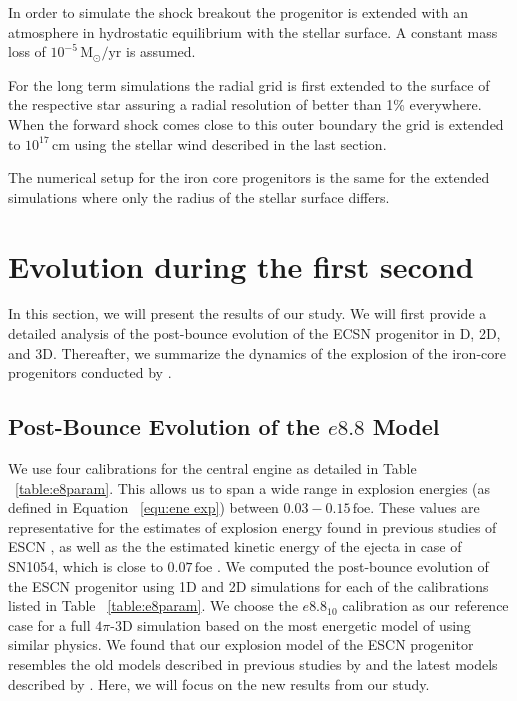 \documentclass[fleqn,usenatbib]{mnras}
\begin{document}
In order to simulate the shock breakout the progenitor is extended with an atmosphere in hydrostatic equilibrium with the stellar surface. A constant mass loss of $10^{-5}\,\mathrm{M_{\odot}/yr}$ is assumed. 


For the long term simulations the radial grid is first extended to the surface of the respective star assuring a radial resolution of better than 1\% everywhere. When the forward shock comes close to this outer boundary the grid is extended to $10^{17}\,\mathrm{cm}$ using the stellar wind described in the last section. 

The numerical setup for the iron core progenitors is the same for the extended simulations where only the radius of the stellar surface differs. 

\section{Evolution during the first second}
In this section, we will present the results of our study. We will first provide a detailed analysis of the post-bounce evolution of the ECSN progenitor in D, 2D, and 3D. Thereafter, we summarize the dynamics of the explosion of the iron-core progenitors conducted by \citealt{Melson2015a,Melson2019}. 

\subsection{Post-Bounce Evolution of the $e8.8$ Model}
We use four calibrations for the central engine as detailed in Table ~\ref{table:e8param}. This allows us to span a wide range in explosion energies (as defined in Equation ~\ref{equ:ene exp}) between $0.03-0.15\, \text{foe}$. These values are representative for the estimates of explosion energy found in previous studies of ESCN \citep{Groote2014,Radice2017}, as well as the the estimated kinetic energy of the ejecta in case of SN1054, which is close to $0.07\, \text{foe}$ \citep{Smith2013}. We computed the post-bounce evolution of the ESCN progenitor using 1D and 2D simulations for each of the calibrations listed in Table ~\ref{table:e8param}. We choose the $e8.8_{10}$ calibration as our reference case for a full $4\pi$-3D simulation based on the most energetic model of \citet{Groote2014} using similar physics. 
We found that our explosion model of the ESCN progenitor resembles the old models described in previous studies by \citet{Kitaura2006,Janka2008} and the latest models described by \citet{Gessner2018}. Here, we will focus on the new results from our study.
\end{document}
